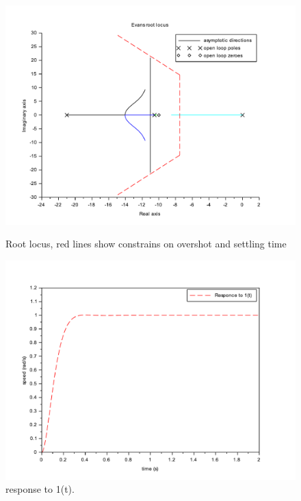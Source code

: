 \documentclass[a4paper,12pt,oneside]{article}
\begin{document}
\begin{figure}
	\centering
	\includegraphics[width=\columnwidth]{../controler/root_locus}
	\caption{Root locus, red lines show constrains on overshot and settling time}
	\label{fig:root_locus}
	\centering
	\includegraphics[width=\columnwidth]{../controler/response}
	\caption{response to 1(t).}
	\label{fig:response}
\end{figure}
\end{document}

